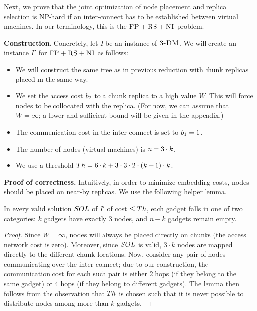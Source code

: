 Next, we prove that the joint optimization of node placement and replica selection
is NP-hard if an inter-connect has to be established between virtual machines.
In our terminology, this is the $\textsc{FP}+\textsc{RS}+\textsc{NI}$ problem.

\textbf{Construction.}
Concretely, let $I$ be an instance of $\textsc{3-DM}$. We will create an instance $I'$
for $\textsc{FP}+\textsc{RS}+\textsc{NI}$ as follows:
\begin{itemize}
\item We will construct the same tree as in previous reduction with
chunk replicas placed in the same way.
\item We set the access cost $b_2$ to a chunk replica to a high value $W$. This will force
nodes to be collocated with the replica.
(For now, we can assume that $W=\infty$; a lower and sufficient bound will be given
in the appendix.)
\item The communication cost in the inter-connect is set to $b_1 = 1$.
\item The number of nodes (virtual machines) is $n = 3 \cdot k$.
\item We use a threshold $Th =  6 \cdot k + 3 \cdot 3 \cdot 2 \cdot
(k - 1) \cdot k$.
\end{itemize}


\textbf{Proof of correctness.}
Intuitively, in order to minimize embedding costs,
nodes should be placed on near-by replicas. We use the following
helper lemma.
\begin{lemma}\label{lemma:helper}
In every valid solution $SOL$ of $I'$ of cost $\leq Th$, each gadget
falls in one of two categories:
$k$ gadgets have exactly
$3$ nodes, and $n-k$ gadgets remain empty.
\end{lemma}
\begin{proof}
Since $W=\infty$, nodes will always be placed
directly on chunks (the access network cost is zero).
Moreover, since
$SOL$ is valid, $3 \cdot k$ nodes are mapped
directly to the different chunk locations.
Now, consider any pair of nodes communicating over the
inter-connect; due to our construction, the communication cost
for each such pair is either
2 hops (if they belong to the same gadget) or 4 hops (if they belong
to different gadgets).
The lemma then follows from the observation that $Th$
is chosen such that it is never possible to distribute nodes
among more than $k$ gadgets.
\end{proof}

